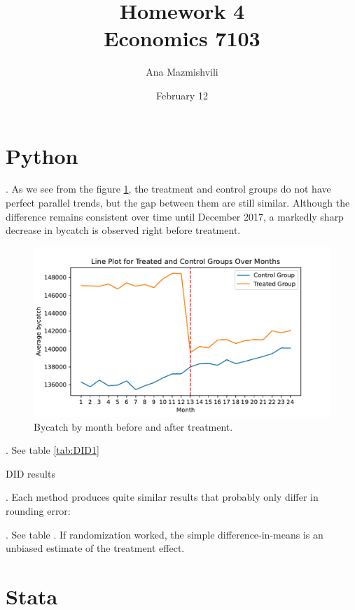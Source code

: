 \documentclass{article}
\title{Homework 4 \\ Economics 7103}
\author{Ana Mazmishvili}
\date{February 12}
\begin{document}
  
\maketitle

\section{Python}

. As we see from the figure \ref{fig:trend}, the treatment and control groups do not have perfect parallel trends, but the gap between them are still similar. Although the difference remains consistent over time until December 2017, a markedly sharp decrease in bycatch is observed right before treatment.

\begin{figure}[h]
    \centering
    \includegraphics{homework 4/output/figure/trend1.pdf}
    \caption{ Bycatch by month before and after treatment. }
    \label{fig:trend}
\end{figure}

\FloatBarrier

. See table \ref{tab:DID1}

\begin{table}[]
    \centering
    
    \caption{DID results}
    \label{tab:DID1}
\end{table}


. Each method produces quite similar results that probably only differ in rounding error:


. See table .  If randomization worked, the simple difference-in-means is an unbiased estimate of the treatment effect.

\section{Stata}
\end{document}
